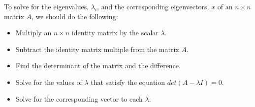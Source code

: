 \documentclass[fleqn]{article}
\begin{document}
\begin{enumerate}
        \textcolor{hwColor}{
          To solve for the eigenvalues, $\lambda_i$, and the corresponding eigenvectors, $x$ of an $n \times n$ matrix 
          $A$, we should do the following: 
          \\
          \begin{itemize}
            \item Multiply an $n \times n$ identity matrix by the scalar $\lambda$.
            \item Subtract the identity matrix multiple from the matrix $A$.
            \item Find the determinant of the matrix and the difference.
            \item Solve for the values of $\lambda$ that satisfy the equation $det\left(A-\lambda I\right)=0$.
            \item Solve for the corresponding vector to each $\lambda$.
          \end{itemize}
        }

        \pagebreak


\end{enumerate}
\end{document}
